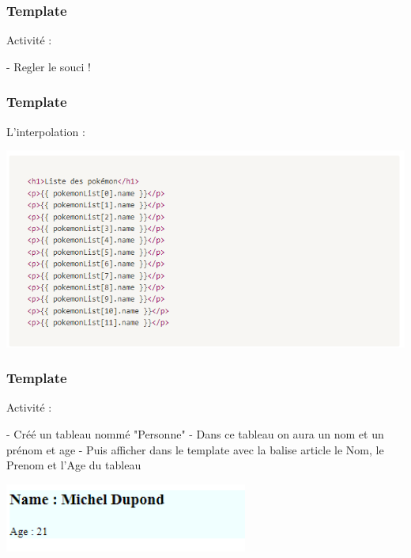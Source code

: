 \documentclass[10pt]{beamer}
\begin{document}
	\begin{frame}
		\frametitle{Template}

		Activité : \newline \newline

		- Regler le souci !

	\end{frame}

	\begin{frame}
		\frametitle{Template}

		L'interpolation : \newline

		\centering
		\includegraphics[width=14cm]{assets/inter2} \newline


	\end{frame}

	\begin{frame}
		\frametitle{Template}

		Activité : \newline \newline

		- Créé un tableau nommé "Personne" \newline
		- Dans ce tableau on aura un nom et un prénom et age \newline
		- Puis afficher dans le template avec la balise article le Nom, le Prenom et l'Age du tableau \newline \newline

		\centering
		\includegraphics[width=8cm]{assets/exempleAct} \newline


	\end{frame}
\end{document}
